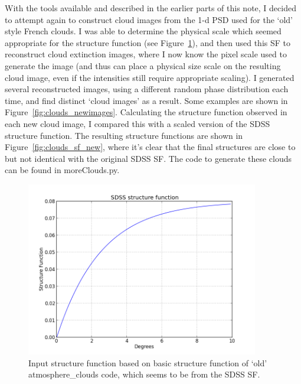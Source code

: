 \documentclass[11pt,preprint]{aastex}
\begin{document}
With the tools available and described in the earlier parts of this note, I decided to attempt again to construct cloud images from the 1-d PSD used for the `old' style French clouds. I was able to determine the physical scale which seemed appropriate for the structure function (see Figure~\ref{fig:sf_degrees}), and then used this SF to reconstruct cloud extinction images, where I now know the pixel scale used to generate the image (and thus can place a physical size scale on the resulting cloud image, even if the intensities still require appropriate scaling). I generated several reconstructed images, using a different random phase distribution each time, and find distinct `cloud images' as a result. Some examples are shown in Figure~\ref{fig:clouds_newimages}.  Calculating the structure function observed in each new cloud image, I compared this with a scaled version of the SDSS structure function. The resulting structure functions are shown in Figure~\ref{fig:clouds_sf_new}, where it's clear that the final structures are close to but not identical with the original SDSS SF. The code to generate these clouds can be found in moreClouds.py. 

\begin{figure}[htpb]
\centering
\includegraphics[width=4in]{clouds_sf_SDSS}
\caption{{\small
Input structure function based on basic structure function of `old' atmosphere\_clouds code, which seems to be from the SDSS SF.}}
\label{fig:sf_degrees}
\end{figure}
\end{document}
